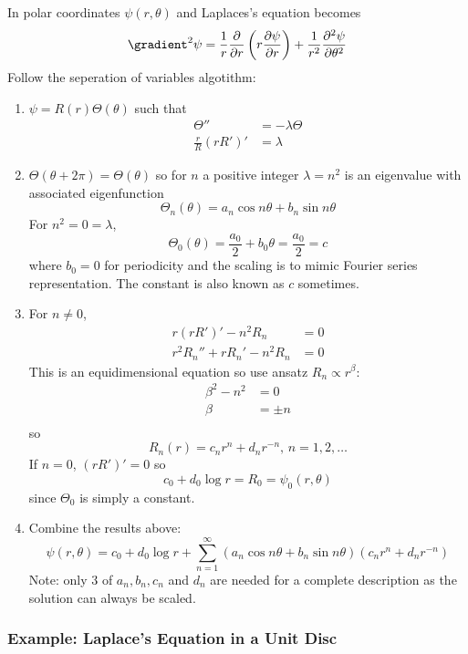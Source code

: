 \documentclass[a4paper]{article}
\newcommand*\grad{\gradient}
\newcommand*\laplace{\grad^2}
\newcommand*\lap{\laplace}
\begin{document}
In polar coordinates \(\psi(r, \theta)\) and Laplaces's equation becomes
\[
  \lap \psi = \frac{1}{r} \frac{\partial  }{\partial r}\left(r \frac{\partial \psi}{\partial r} \right) + \frac{1}{r^2} \frac{\partial^2 \psi}{\partial \theta^2}
\]
Follow the seperation of variables algotithm:
\begin{enumerate}
\item \(\psi = R(r) \Theta(\theta)\) such that
  \begin{align*}
    \Theta'' &= -\lambda \Theta \\
    \frac{r}{R}(rR')' &= \lambda
  \end{align*}
\item \(\Theta(\theta + 2\pi) = \Theta(\theta)\) so for \(n \) a positive integer \(\lambda = n^2\) is an eigenvalue with associated eigenfunction
  \[
    \Theta_n(\theta) = a_n \cos n\theta + b_n \sin n\theta
  \]
  For \(n^2 = 0 = \lambda\),
  \[
    \Theta_0(\theta) = \frac{a_0}{2} + b_0 \theta = \frac{a_0}{2} = c
  \]
  where \(b_0 = 0\) for periodicity and the scaling is to mimic Fourier series representation. The constant is also known as \(c\) sometimes.

\item For \(n \neq 0\),
  \begin{align*}
    r(rR')' - n^2 R_n &= 0 \\
    r^2R_n'' + rR_n' - n^2R_n &= 0 
  \end{align*}
  This is an equidimensional equation so use ansatz \(R_n \propto r^\beta\):
  \begin{align*}
    \beta^2 - n^2 &= 0 \\
    \beta &= \pm n \\
  \end{align*}
  so
  \[
    R_n(r) = c_n r^n + d_n r^{-n}, \, n = 1, 2, \dots
  \]
  If \(n = 0\), \((rR')' = 0\) so
  \[
    c_0 + d_0 \log r = R_0 = \psi_0(r, \theta)
  \]
  since \(\Theta_0\) is simply a constant.
\item Combine the results above:
  \[
    \psi(r, \theta) = c_0 + d_0 \log r + \sum_{n = 1}^{\infty} \left( a_n \cos n\theta + b_n \sin n\theta \right) \left( c_n r^n + d_n r^{-n} \right)
  \]
  Note: only \(3\) of \(a_n, b_n, c_n \) and \(d_n\) are needed for a complete description as the solution can always be scaled.
\end{enumerate}

\subsubsection{Example: Laplace's Equation in a Unit Disc}
\end{document}
